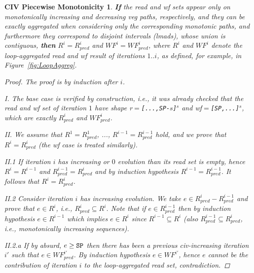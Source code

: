\documentclass{sig-alternate}
\begin{document}
\newtheorem{theorem}{CIV Piecewise Monotonicity}
\begin{theorem}
{\bf If} the read and {\sc wf} sets appear only on monotonically increasing and decreasing 
{\sc veg} paths, respectively, and they can be exactly aggregated  when considering only the
corresponding monotonic paths, and furthermore they correspond to disjoint intervals ({\sc lmad}s), 
whose union is contiguous,
{\bf then} $R^i = R_{pred}^{i}$ and $WF^i = WF_{pred}^{i}$, where $R^i$ and $WF^i$
denote the loop-aggregated read and {\sc wf} result of iterations $1..i$,
as defined, for example, in Figure~\ref{fig:LoopAggreg}.
\begin{proof}
The proof is by induction after $i$. %

I. The base case is verified by construction, i.e., it was already checked that the 
read and {\sc wf} set of iteration $1$ have shape 
{\sc r}$=${\tt [...,SP-$s$]$^s$} and {\sc wf}$=${\tt[SP,...]$^s$}, which are exactly
$R_{pred}^i$ and $WF_{pred}^{i}$. \vspace{1ex}  

II. We assume that $R^1 = R_{pred}^{1}$, ..., $R^{i-1} = R_{pred}^{i-1}$ hold, and we
prove that $R^i = R_{pred}^{i}$ (the {\sc wf} case is treated similarly). \vspace{1ex}  

II.1 If iteration $i$ has increasing or $0$ evolution than its read set is empty, hence
$R^i=R^{i-1}$ and $R_{pred}^{i-1} = R_{pred}^i$ and by induction hypothesis 
$R^{i-1}=R_{pred}^{i-1}$. It follows that $R^i = R_{pred}^{i}$. \vspace{1ex}  

II.2 Consider iteration $i$ has increasing evolution. We take $e \in R_{pred}^{i} - R_{pred}^{i-1}$
and prove that $e \in R^{i}$, i.e., $R_{pred}^{i} \subseteq R^i$. 
Note that if $e \in R_{pred}^{i-1}$ then by induction hypothesis
$e \in R^{i-1}$ which implies $e \in R^{i}$ since $R^{i-1} \subseteq R^i$  
(also $R_{pred}^{i-1} \subseteq R_{pred}^{i}$, i.e., monotonically increasing sequences). \vspace{1ex}

II.2.a If by absurd, $e \ge {\tt{}SP}$ then there has been a previous {\sc civ}-increasing 
iteration $i'$ such that $e \in WF_{pred}^{i'}$. By induction hypothesis $e \in WF^{i'}$, 
hence $e$ cannot be the contribution of iteration $i$ to the
loop-aggregated read set, contradiction. \vspace{1ex}


\end{proof}
\end{theorem}
\end{document}
